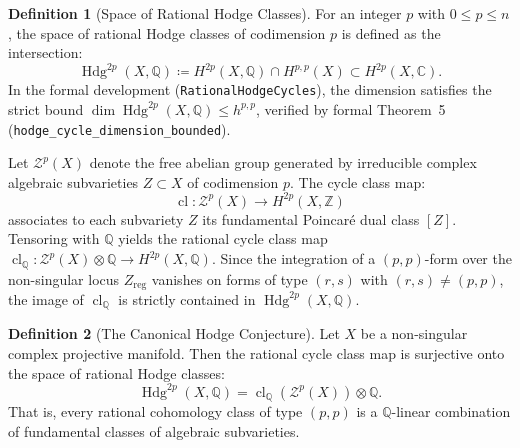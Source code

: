 \documentclass[11pt,a4paper]{article}
\theoremstyle{definition}
\newtheorem{definition}{Definition}[section]
\theoremstyle{plain}
\DeclareMathOperator{\Hdg}{Hdg}
\DeclareMathOperator{\cl}{cl}
\begin{document}
\begin{definition}[Space of Rational Hodge Classes]
\label{def:hodge_classes}
For an integer $p$ with $0 \le p \le n$, the space of rational Hodge classes of codimension $p$ is defined as the intersection:
\begin{equation}
    \label{eq:hodge_space_def}
    \Hdg^{2p}(X, \mathbb{Q}) \coloneqq H^{2p}(X, \mathbb{Q}) \cap H^{p,p}(X) \subset H^{2p}(X, \mathbb{C}).
\end{equation}
In the formal development (\texttt{RationalHodgeCycles}), the dimension satisfies the strict bound $\dim \Hdg^{2p}(X, \mathbb{Q}) \le h^{p,p}$, verified by formal Theorem~5 (\texttt{hodge\_cycle\_dimension\_bounded}).
\end{definition}

Let $\mathcal{Z}^p(X)$ denote the free abelian group generated by irreducible complex algebraic subvarieties $Z \subset X$ of codimension $p$. The cycle class map:
\begin{equation}
    \label{eq:cycle_map}
    \cl: \mathcal{Z}^p(X) \longrightarrow H^{2p}(X, \mathbb{Z})
\end{equation}
associates to each subvariety $Z$ its fundamental Poincaré dual class $[Z]$. Tensoring with $\mathbb{Q}$ yields the rational cycle class map $\cl_{\mathbb{Q}}: \mathcal{Z}^p(X) \otimes \mathbb{Q} \to H^{2p}(X, \mathbb{Q})$. Since the integration of a $(p,p)$-form over the non-singular locus $Z_{\mathrm{reg}}$ vanishes on forms of type $(r,s)$ with $(r,s) \ne (p,p)$, the image of $\cl_{\mathbb{Q}}$ is strictly contained in $\Hdg^{2p}(X, \mathbb{Q})$.

\begin{definition}[The Canonical Hodge Conjecture]
\label{def:hodge_conjecture}
Let $X$ be a non-singular complex projective manifold. Then the rational cycle class map is surjective onto the space of rational Hodge classes:
\begin{equation}
    \label{eq:hodge_conjecture_statement}
    \boxed{\Hdg^{2p}(X, \mathbb{Q}) = \cl_{\mathbb{Q}}\left( \mathcal{Z}^p(X) \right) \otimes \mathbb{Q}.}
\end{equation}
That is, every rational cohomology class of type $(p,p)$ is a $\mathbb{Q}$-linear combination of fundamental classes of algebraic subvarieties.
\end{definition}
\end{document}
